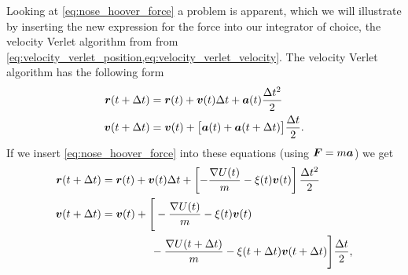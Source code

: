 Looking at \cref{eq:nose_hoover_force} a problem is apparent, which we will illustrate by inserting the new expression for the force into our integrator of choice, the velocity Verlet algorithm from from \cref{eq:velocity_verlet_position,eq:velocity_verlet_velocity}. The velocity Verlet algorithm has the following form
\begin{align*}
    \boldsymbol{r}(t + \Delta t) &= \boldsymbol{r}(t) + \boldsymbol{v}(t)\Delta t + \boldsymbol{a}(t)\frac{\Delta t^2}{2}\\
    \boldsymbol{v}(t + \Delta t) &= \boldsymbol{v}(t) + \big[\boldsymbol{a}(t) + \boldsymbol{a}(t + \Delta t)\big] \frac{\Delta t}{2}.
\end{align*}
If we insert \cref{eq:nose_hoover_force} into these equations (using $\boldsymbol{F} = m\boldsymbol{a}$) we get
\begin{align*} %
    \rvec(t + \Delta t) &= \rvec(t) + \vvec(t)\Delta t + \left[ -\frac{\nabla U(t)}{m} - \xi(t)\vec v(t) \right] \frac{\Delta t^2}{2}\\
    \vvec(t + \Delta t) 
        &= \vvec(t) + \Bigg[ 
                -\frac{\nabla U(t)}{m} - \xi(t)\vec v(t) \\
                &\phantom{= \vvec(t) + \Big[} -\frac{\nabla U(t+\Delta t)}{m} - \xi(t+\Delta t)\vec v(t+\Delta t)
        \Bigg] 
        \frac{\Delta t}{2},
\end{align*}
